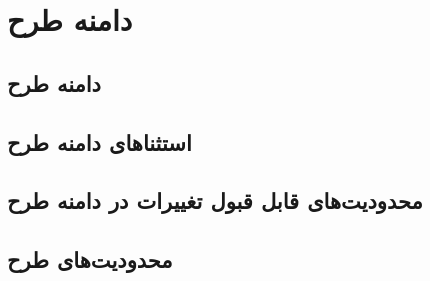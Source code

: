 %
% 
% 
% 
%
%
\section{دامنه طرح}


\subsection{دامنه طرح}


\subsection{استثناهای دامنه طرح}


\subsection{محدودیت‌های قابل قبول تغییرات در دامنه طرح}


\subsection{محدودیت‌های طرح}

